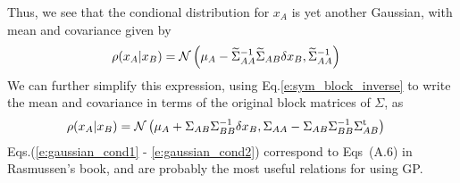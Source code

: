 \documentclass[nobib]{tufte-handout}
\begin{document}
Thus, we see that the condional distribution for $x_A$ is yet another Gaussian, with mean and covariance given by
\begin{align}
  \rho(x_A\lvert x_B) &= \mathcal{N}\left(\mu_A - \widetilde{\Sigma}_{AA}^{-1}\widetilde{\Sigma}_{AB}\delta x_B, \widetilde{\Sigma}_{AA}^{-1}\right)\label{e:gaussian_cond1}
\end{align}
We can further simplify this expression, using Eq.\eqref{e:sym_block_inverse} to write the mean and covariance in terms of the original block matrices of $\Sigma$, as
\begin{align}
  \rho(x_A\lvert x_B) &= \mathcal{N}\left(\mu_A + \Sigma_{AB}\Sigma^{-1}_{BB}\delta x_{B}, \Sigma_{AA} - \Sigma_{AB}\Sigma^{-1}_{BB}\Sigma_{AB}^\textrm{t}\right)\label{e:gaussian_cond2}
\end{align}
Eqs.(\ref{e:gaussian_cond1} - \ref{e:gaussian_cond2}) correspond to Eqs~(A.6) in Rasmussen's book, and are probably the most useful relations for using GP.
\end{document}
